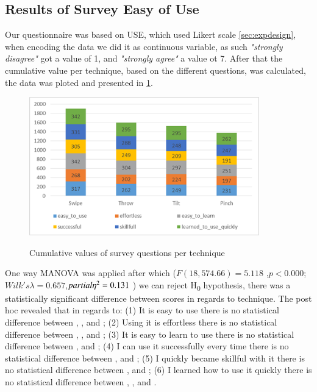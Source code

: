 \subsection{Results of Survey Easy of Use}
Our questionnaire was based on USE, which used Likert scale \ref*{sec:expdesign}, when encoding the data we did it as continuous variable, as such \emph{"strongly disagree"} got a value of 1, and \emph{"strongly agree"} a value ot 7. After that the cumulative value per technique, based on the different questions, was calculated, the data was ploted and presented in \ref{fig:surveyResult}. 
\begin{figure}[H]
	{\includegraphics[width = 1\columnwidth , height = 6cm ]{images/survey-data.png}} 
	\caption{
		Cumulative values of survey questions per technique
	}
	\label{fig:surveyResult}
\end{figure}

One way MANOVA was applied after which ($F(18, 574.66)=5.118$ ,$p<0.000$; $Wilk's \lambda =0.657$,$partial  \eta\textsuperscript{2} = 0.131$ ) we can reject H\textsubscript{0} hypothesis, there was a statistically significant difference between scores in regards to technique. 
The post hoc revealed that in regards to: (1) It is easy to use there is no statistical difference between \throw, \tilt, and \pinch; (2) Using it is effortless there is no statistical difference between \throw, \tilt, and \pinch; (3) It is easy to learn to use there is no statistical difference between \tilt, and \throw; (4) I can use it successfully every time there is no statistical difference between \tilt, and \pinch; (5) I quickly became skillful with it there is no statistical difference between \pinch, and \tilt; (6) I learned how to use it quickly  there is no statistical difference between \throw, \tilt, and \pinch.